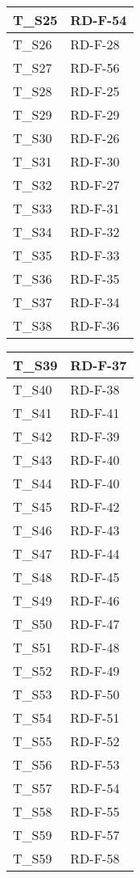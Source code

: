 \begin{center}
\begin{tabular}{|m{6em}|m{8em}|}
        \hline
        T\_S25 & RD-F-54\\
        \hline
        T\_S26 & RD-F-28\\
        \hline
        T\_S27 & RD-F-56\\
        \hline
        T\_S28 & RD-F-25\\
        \hline
        T\_S29 & RD-F-29\\
        \hline
        T\_S30 & RD-F-26\\
        \hline
        T\_S31 & RD-F-30\\
        \hline
        T\_S32 & RD-F-27\\
        \hline
        T\_S33 & RD-F-31\\
        \hline
        T\_S34 & RD-F-32\\
        \hline
        T\_S35 & RD-F-33\\
        \hline
        T\_S36 & RD-F-35\\
        \hline
        T\_S37 & RD-F-34\\
        \hline
        T\_S38 & RD-F-36\\
        \hline
    \end{tabular}
    \newpage
    \renewcommand{\arraystretch}{1.8}
    \begin{tabular}{|m{6em}|m{8em}|}
        \hline
        T\_S39 & RD-F-37\\
        \hline
        T\_S40 & RD-F-38\\
        \hline
        T\_S41 & RD-F-41\\
        \hline
        T\_S42 & RD-F-39\\
        \hline
        T\_S43 & RD-F-40\\
        \hline
        T\_S44 & RD-F-40\\
        \hline
        T\_S45 & RD-F-42\\
        \hline
        T\_S46 & RD-F-43\\
        \hline
        T\_S47 & RD-F-44\\
        \hline
        T\_S48 & RD-F-45\\
        \hline
        T\_S49 & RD-F-46\\
        \hline
        T\_S50 & RD-F-47\\
        \hline
        T\_S51 & RD-F-48\\
        \hline
        T\_S52 & RD-F-49\\
        \hline
        T\_S53 & RD-F-50\\
        \hline
        T\_S54 & RD-F-51\\
        \hline
        T\_S55 & RD-F-52\\
        \hline
        T\_S56 & RD-F-53\\
        \hline
        T\_S57 & RD-F-54\\
        \hline
        T\_S58 & RD-F-55\\
        \hline
        T\_S59 & RD-F-57\\
        \hline
        T\_S59 & RD-F-58\\
        \hline
    \end{tabular}
\end{center}
